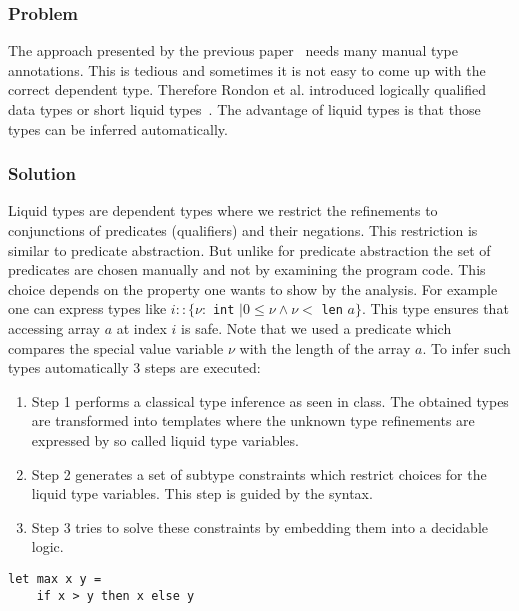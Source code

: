 \documentclass[a4paper,UKenglish]{lipics-v2016}
\begin{document}
\subsubsection{Problem}

The approach presented by the previous paper~\cite{Xi:1998:EAB} needs many manual type annotations.
This is tedious and sometimes it is not easy to come up with the correct dependent type.
Therefore Rondon et al. introduced logically qualified data types or short liquid types~\cite{Rondon:2008:LT}.
The advantage of liquid types is that those types can be inferred automatically.

\subsubsection{Solution}

Liquid types are dependent types where we restrict the refinements to conjunctions of predicates (qualifiers) and their negations.
This restriction is similar to predicate abstraction.
But unlike for predicate abstraction the set of predicates are chosen manually and not by examining the program code.
This choice depends on the property one wants to show by the analysis.
For example one can express types like $i:: \{\nu:$ \lstinline{int} $\mid 0 \le \nu \land \nu <$ \lstinline{len} $a\}$.
This type ensures that accessing array $a$ at index $i$ is safe.
Note that we used a predicate which compares the special value variable $\nu$ with the length of the array $a$.
To infer such types automatically 3 steps are executed:\\
\begin{enumerate}
    \item Step 1 performs a classical type inference as seen in class.
        The obtained types are transformed into templates where the unknown type refinements are expressed by so called liquid type variables.
    \item Step 2 generates a set of subtype constraints which restrict choices for the liquid type variables.
        This step is guided by the syntax.
    \item Step 3 tries to solve these constraints by embedding them into a decidable logic.
\end{enumerate}

\begin{lstlisting}[caption={Example Program},label=lst:exmpl,captionpos=t,float,abovecaptionskip=-\medskipamount]
let max x y =
    if x > y then x else y
\end{lstlisting}
\end{document}
